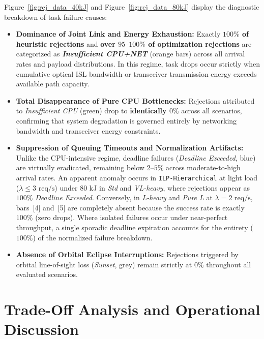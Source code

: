 Figure~\ref{fig:rej_data_40kJ} and Figure~\ref{fig:rej_data_80kJ} display the diagnostic breakdown of task failure causes:
\begin{itemize}
    \item \textbf{Dominance of Joint Link and Energy Exhaustion:} Exactly \textbf{$100\%$ of heuristic rejections} and \textbf{over $95\text{--}100\%$ of optimization rejections} are categorized as \textbf{\textit{Insufficient CPU+NET}} (orange bars) across all arrival rates and payload distributions. In this regime, task drops occur strictly when cumulative optical ISL bandwidth or transceiver transmission energy exceeds available path capacity.
    \item \textbf{Total Disappearance of Pure CPU Bottlenecks:} Rejections attributed to \textit{Insufficient CPU} (green) drop to \textbf{identically $0\%$} across all scenarios, confirming that system degradation is governed entirely by networking bandwidth and transceiver energy constraints.
    \item \textbf{Suppression of Queuing Timeouts and Normalization Artifacts:} Unlike the CPU-intensive regime, deadline failures (\textit{Deadline Exceeded}, blue) are virtually eradicated, remaining below $2\text{--}5\%$ across moderate-to-high arrival rates. An apparent anomaly occurs in \texttt{ILP-Hierarchical} at light load ($\lambda \le 3\text{ req/s}$) under $80\text{ kJ}$ in \textit{Std} and \textit{VL-heavy}, where rejections appear as $100\%$ \textit{Deadline Exceeded}. Conversely, in \textit{L-heavy} and \textit{Pure L} at $\lambda = 2\text{ req/s}$, bars~[4] and~[5] are completely absent because the success rate is exactly $100\%$ (zero drops). Where isolated failures occur under near-perfect throughput, a single sporadic deadline expiration accounts for the entirety ($100\%$) of the normalized failure breakdown.
    \item \textbf{Absence of Orbital Eclipse Interruptions:} Rejections triggered by orbital line-of-sight loss (\textit{Sunset}, grey) remain strictly at \textbf{$0\%$} throughout all evaluated scenarios.
\end{itemize}
\FloatBarrier
\section{Trade-Off Analysis and Operational Discussion}
\label{sec:bench_tradeoffs}

